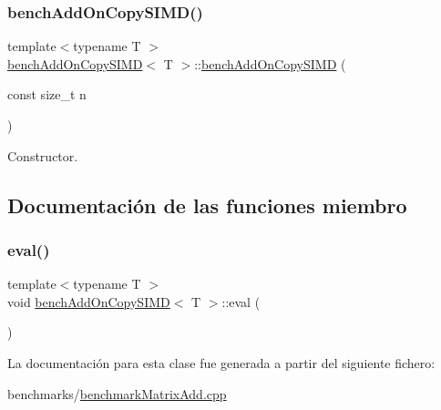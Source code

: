 \subsubsection{\texorpdfstring{bench\+Add\+On\+Copy\+S\+I\+M\+D()}{benchAddOnCopySIMD()}}
{\footnotesize\ttfamily template$<$typename T $>$ \\
\hyperlink{classbenchAddOnCopySIMD}{bench\+Add\+On\+Copy\+S\+I\+MD}$<$ T $>$\+::\hyperlink{classbenchAddOnCopySIMD}{bench\+Add\+On\+Copy\+S\+I\+MD} (\begin{DoxyParamCaption}\item[{const size\+\_\+t}]{n }\end{DoxyParamCaption})\hspace{0.3cm}{\ttfamily [inline]}}



Constructor. 



\subsection{Documentación de las funciones miembro}
\mbox{\label{classbenchAddOnCopySIMD_a826842d62d4f06661183a7260eb91ee4}} 
\subsubsection{\texorpdfstring{eval()}{eval()}}
{\footnotesize\ttfamily template$<$typename T $>$ \\
void \hyperlink{classbenchAddOnCopySIMD}{bench\+Add\+On\+Copy\+S\+I\+MD}$<$ T $>$\+::eval (\begin{DoxyParamCaption}{ }\end{DoxyParamCaption})\hspace{0.3cm}{\ttfamily [inline]}}



La documentación para esta clase fue generada a partir del siguiente fichero\+:\begin{DoxyCompactItemize}
\item 
benchmarks/\hyperlink{benchmarkMatrixAdd_8cpp}{benchmark\+Matrix\+Add.\+cpp}\end{DoxyCompactItemize}
